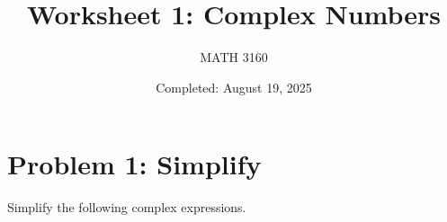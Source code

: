 \documentclass{article}
\title{Worksheet 1: Complex Numbers}
\author{
  MATH 3160\\
  \myauthor
}
\date{Completed: August 19, 2025}
\begin{document}
\maketitle %


\section*{Problem 1: Simplify}
Simplify the following complex expressions. 
\end{document}
